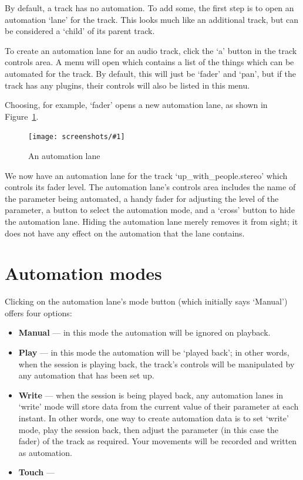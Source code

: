 \documentclass[10pt,a4paper]{book}
\newcommand{\todo}[1]{\marginpar{\small\texttt{#1}}}
\newcommand{\screenshot}[3]{%
\begin{figure}[ht]%
\begin{center}
\texttt{[image: screenshots/\#1]}
\end{center}
\caption{#2}
\label{#3}
\end{figure}}
\begin{document}
{By default, a track has no automation.  To add some, the first step is
to open an automation `lane' for the track.  This looks much like an
additional track, but can be considered a `child' of its parent track.

To create an automation lane for an audio track, click the `a' button
in the track controls area.  A menu will open which contains a list of
the things which can be automated for the track.  By default, this
will just be `fader' and `pan', but if the track has any plugins,
their controls will also be listed in this menu.

Choosing, for example, `fader' opens a new automation lane, as shown
in Figure~\ref{fig:automation-lane}.

\screenshot{automation-lane.png}{An automation lane}{fig:automation-lane}

We now have an automation lane for the track `up\_with\_people.stereo'
which controls its fader level.  The automation lane's controls area
includes the name of the parameter being automated, a handy fader for
adjusting the level of the parameter, a button to select the
automation mode, and a `cross' button to hide the automation lane.
Hiding the automation lane merely removes it from sight; it does not
have any effect on the automation that the lane contains.


\section{Automation modes}

Clicking on the automation lane's mode button (which initially says `Manual') offers four options:

\begin{itemize}
\item \textbf{Manual} --- in this mode the automation will be ignored on playback.
\item \textbf{Play} --- in this mode the automation will be `played
  back'; in other words, when the session is playing back, the track's
  controls will be manipulated by any automation that has been set up.
\item \textbf{Write} --- when the session is being played back, any
  automation lanes in `write' mode will store data from the current
  value of their parameter at each instant.  In other words, one way
  to create automation data is to set `write' mode, play the session
  back, then adjust the parameter (in this case the fader) of the
  track as required.  Your movements will be recorded and written as
  automation.
\item \textbf{Touch} --- \todo{doesn't seem to work right now}
\end{itemize}


}
\end{document}
